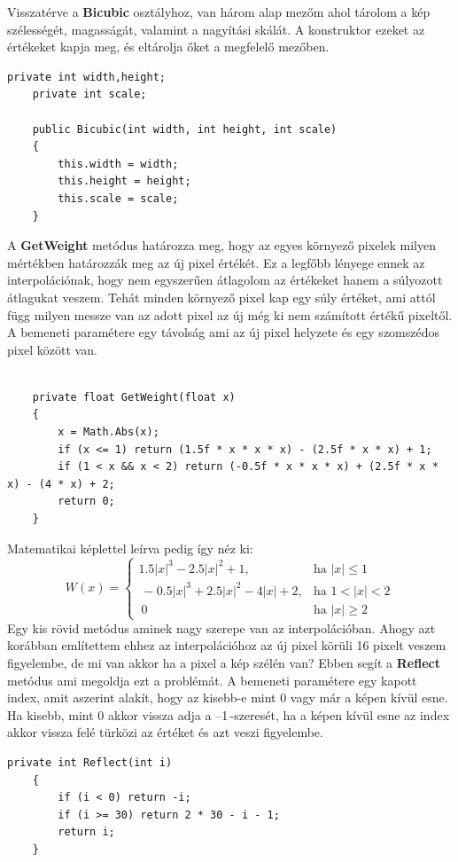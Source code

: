 \documentclass[]{thesis-ekf}
\theoremstyle{definition}
\theoremstyle{remark}
\begin{document}
Visszatérve a \textbf{Bicubic} osztályhoz, van három alap mezőm ahol tárolom a kép szélességét, magasságát, valamint a nagyítási skálát. A konstruktor ezeket az értékeket kapja meg, és eltárolja őket a megfelelő mezőben.
\begin{lstlisting}[language=CSharp]
	private int width,height;
	private int scale;
	
	public Bicubic(int width, int height, int scale)
	{
		this.width = width;
		this.height = height;
		this.scale = scale;
	}
\end{lstlisting}
A \textbf{GetWeight} metódus határozza meg, hogy az egyes környező pixelek milyen mértékben határozzák meg az új pixel értékét. Ez a legfőbb lényege ennek az interpolációnak, hogy nem egyszerűen átlagolom az értékeket hanem a súlyozott átlagukat veszem. Tehát minden környező pixel kap egy súly értéket, ami attól függ milyen messze van az adott pixel az új még ki nem számított értékű pixeltől. A bemeneti paramétere egy távolság ami az új pixel helyzete és egy szomszédos pixel között van.
\begin{lstlisting}[language=CSharp]
	
	private float GetWeight(float x)
	{
		x = Math.Abs(x);
		if (x <= 1) return (1.5f * x * x * x) - (2.5f * x * x) + 1;
		if (1 < x && x < 2) return (-0.5f * x * x * x) + (2.5f * x * x) - (4 * x) + 2;
		return 0;
	}
\end{lstlisting}
Matematikai képlettel leírva pedig így néz ki:
\[
W(x) = 
\begin{cases}
	1.5|x|^3 - 2.5|x|^2 + 1, & \text{ha } |x| \leq 1 \\\
	-0.5|x|^3 + 2.5|x|^2 - 4|x| + 2, & \text{ha } 1 < |x| < 2 \\\
	0 & \text{ha } |x| \geq 2
\end{cases}
\]
Egy kis rövid metódus aminek nagy szerepe van az interpolációban. Ahogy azt korábban említettem ehhez az interpolációhoz az új pixel körüli 16 pixelt veszem figyelembe, de mi van akkor ha a pixel a kép szélén van? Ebben segít a \textbf{Reflect} metódus ami megoldja ezt a problémát. A bemeneti paramétere egy kapott index, amit aszerint alakít, hogy az kisebb-e mint 0 vagy már a képen kívül esne. Ha kisebb, mint 0 akkor vissza adja a --1\,-szeresét, ha a képen kívül esne az index akkor vissza felé türközi az értéket és azt veszi figyelembe.
\begin{lstlisting}[language=CSharp]
	private int Reflect(int i)
	{
		if (i < 0) return -i;
		if (i >= 30) return 2 * 30 - i - 1;
		return i;
	}
\end{lstlisting}
\end{document}
